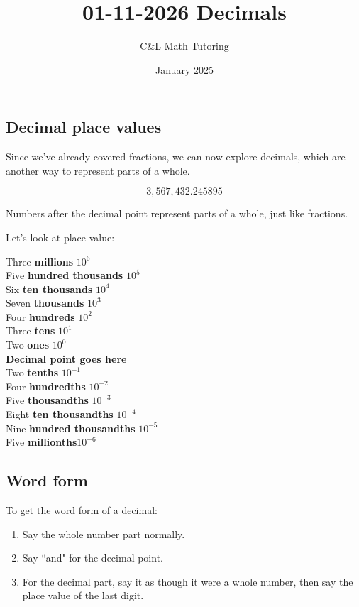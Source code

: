 \documentclass[a4paper, 12pt]{article}
\title{01-11-2026 Decimals}
\author{C\&L Math Tutoring}
\date{January 2025}
\begin{document}
\maketitle

\subsection*{Decimal place values}

Since we've already covered fractions, we can now explore decimals, which are another way to represent parts of a whole.

$$3,567,432.245895$$

Numbers after the decimal point represent parts of a whole, just like
fractions.

Let's look at place value:

Three \textbf{millions} $10^6$\\
Five \textbf{hundred thousands} $10^5$\\
Six \textbf{ten thousands} $10^4$\\
Seven \textbf{thousands} $10^3$\\
Four \textbf{hundreds} $10^2$\\
Three \textbf{tens} $10^1$\\
Two \textbf{ones} $10^0$\\
\textbf{Decimal point goes here} \\
Two \textbf{tenths} $10^{-1}$\\
Four \textbf{hundredths} $10^{-2}$ \\
Five \textbf{thousandths} $10^{-3}$ \\
Eight \textbf{ten thousandths} $10^{-4}$ \\
Nine \textbf{hundred thousandths} $10^{-5}$ \\
Five \textbf{millionths}$10^{-6}$

\subsection*{Word form}

To get the word form of a decimal:

\begin{enumerate}
\item Say the whole number part normally.
\item Say ``and" for the decimal point.
\item For the decimal part, say it as though it were a whole number, then say the place value of the last digit.
\end{enumerate}
\end{document}
